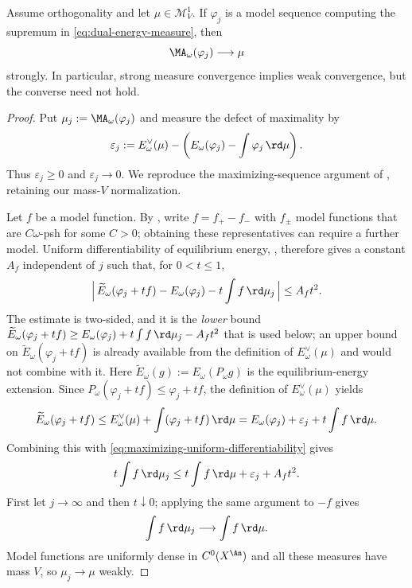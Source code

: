 \begin{theorem}
\label{thm:finite-energy-measure-stability}
Assume orthogonality and let $\mu\in\mathcal M^1_V$.  If
$\varphi_j$ is a model sequence computing the supremum in
\eqref{eq:dual-energy-measure}, then
\[
                     \MA_\omega(\varphi_j)\longrightarrow\mu
\]
strongly.  In particular, strong measure convergence implies weak
convergence, but the converse need not hold.
\end{theorem}
\begin{proof}
Put $\mu_j:=\MA_\omega(\varphi_j)$ and measure the defect of maximality by
\[
 \varepsilon_j:=E_\omega^\vee(\mu)-
 \left(E_\omega(\varphi_j)-\int\varphi_j\,\rd\mu\right).
\]
Thus $\varepsilon_j\geq0$ and $\varepsilon_j\to0$.  We reproduce the
maximizing-sequence argument of
\cite[Theorem~2.22]{BJ25FiniteEnergy}, retaining our mass-$V$
normalization.

Let $f$ be a model function.  By
\cite[Corollary~1.13]{BJ25FiniteEnergy}, write $f=f_+-f_-$ with
$f_\pm$ model functions that are $C\omega$-psh for some $C>0$; obtaining
these representatives can require a further model.  Uniform
differentiability of equilibrium energy,
\cite[Proposition~2.18, equation~(2.19)]{BJ25FiniteEnergy}, therefore gives
a constant
$A_f$ independent of $j$ such that, for $0<t\leq1$,
\begin{equation}\label{eq:maximizing-uniform-differentiability}
 \Bigl|\,\widetilde E_\omega(\varphi_j+tf)-E_\omega(\varphi_j)
   -t\int f\,\rd\mu_j\,\Bigr|
 \leq A_f t^2.
\end{equation}
The estimate is two-sided, and it is the \emph{lower} bound
$\widetilde E_\omega(\varphi_j+tf)\geq
  E_\omega(\varphi_j)+t\int f\,\rd\mu_j-A_ft^2$
that is used below; an upper bound on
$\widetilde E_\omega(\varphi_j+tf)$ is already available from the
definition of $E^\vee_\omega(\mu)$ and would not combine with it.
Here
$\widetilde E_\omega(g):=E_\omega(P_\omega g)$ is the equilibrium-energy
extension.  Since $P_\omega(\varphi_j+tf)\leq\varphi_j+tf$, the definition
of $E_\omega^\vee(\mu)$ yields
\[
 \widetilde E_\omega(\varphi_j+tf)
 \leq E_\omega^\vee(\mu)+
      \int(\varphi_j+tf)\,\rd\mu
 =E_\omega(\varphi_j)+\varepsilon_j+
      t\int f\,\rd\mu.
\]
Combining this with
\eqref{eq:maximizing-uniform-differentiability} gives
\[
 t\int f\,\rd\mu_j
 \leq t\int f\,\rd\mu+\varepsilon_j+A_ft^2.
\]
First let $j\to\infty$ and then $t\downarrow0$; applying the same argument
to $-f$ gives
\[
                     \int f\,\rd\mu_j\longrightarrow
                     \int f\,\rd\mu.
\]
Model functions are uniformly dense in $C^0(X^{\An})$ and all these
measures have mass $V$, so $\mu_j\to\mu$ weakly.


\end{proof}
